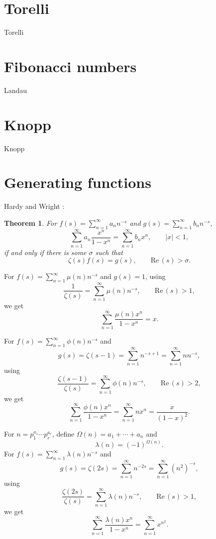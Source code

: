 \documentclass{article}
\def\Re{\ensuremath{\mathrm{Re}}\,}
\newtheorem{theorem}{Theorem}
\begin{document}
\section{Torelli}
Torelli \cite{torelli}

\section{Fibonacci numbers}
Landau \cite{fibonacci}



\section{Knopp}
Knopp \cite{knopp1913}


\section{Generating functions}
Hardy and Wright \cite[p.~258, Theorem 307]{wright}:

\begin{theorem}
For $f(s)=\sum_{n=1}^\infty a_n n^{-s}$ and $g(s)=\sum_{n=1}^\infty b_n n^{-s}$, 
\[
\sum_{n=1}^\infty a_n \frac{x^n}{1-x^n} = \sum_{n=1}^\infty b_n x^n, \qquad |x|<1,
\]
if and only if there is some $\sigma$ such that
\[
\zeta(s) f(s) = g(s), \qquad \Re(s)>\sigma.
\]
\end{theorem}

For $f(s)=\sum_{n=1}^\infty \mu(n) n^{-s}$ and $g(s)=1$,
using \cite[p.~250, Theorem 287]{wright}
\[
\frac{1}{\zeta(s)} = \sum_{n=1}^\infty \mu(n) n^{-s}, \qquad \Re(s)>1,
\]
we get
\begin{equation}
\sum_{n=1}^\infty  \frac{\mu(n) x^n}{1-x^n} = x.
\label{mobiusgenerating}
\end{equation}

For $f(s) = \sum_{n=1}^\infty \phi(n) n^{-s}$ and 
\[
g(s)=\zeta(s-1)=\sum_{n=1}^\infty n^{-s+1} = \sum_{n=1}^\infty n n^{-s},
\]
using \cite[p.~250, Theorem 288]{wright}
\[
\frac{\zeta(s-1)}{\zeta(s)} = \sum_{n=1}^\infty  \phi(n) n^{-s}, \qquad \Re(s)>2,
\]
we get
\[
\sum_{n=1}^\infty  \frac{\phi(n) x^n}{1-x^n} = \sum_{n=1}^\infty nx^n =
\frac{x}{(1-x)^2}.
\]

For $n=p_1^{a_1} \cdots p_r^{a_r}$, define $\Omega(n) = a_1+\cdots+a_n$ and 
\[
\lambda(n)=(-1)^{\Omega(n)}.
\]
For $f(s)= \sum_{n=1}^\infty \lambda(n) n^{-s}$ and
\[
g(s)=\zeta(2s) = \sum_{n=1}^\infty n^{-2s} = \sum_{n=1}^\infty (n^2)^{-s},
\]
using \cite[p.~255, Theorem 300]{wright}
\[
\frac{\zeta(2s)}{\zeta(s)} = \sum_{n=1}^\infty \lambda(n) n^{-s}, \qquad \Re(s)>1,
\]
we get
\[
\sum_{n=1}^\infty \frac{\lambda(n) x^n}{1-x^n} = \sum_{n=1}^\infty x^{n^2}.
\]
\end{document}
